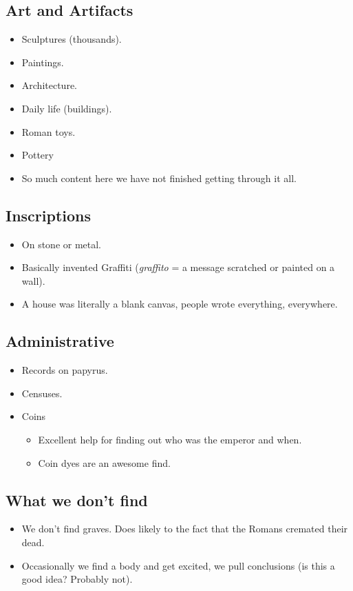 \documentclass[12pt, twoside]{article}
\begin{document}
\subsection{Art and Artifacts}
\begin{itemize}
\item Sculptures (thousands).
\item Paintings.
\item Architecture.
\item Daily life (buildings).
\item Roman toys.
\item Pottery
\item So much content here we have not finished getting through it all.
\end{itemize}

\subsection{Inscriptions}
\begin{itemize}
\item On stone or metal.
\item Basically invented Graffiti (\emph{graffito} = a message scratched or painted on a wall).
\item A house was literally a blank canvas, people wrote everything, everywhere. 
\end{itemize}

\subsection{Administrative}
\begin{itemize}
\item Records on papyrus.
\item Censuses.
\item Coins
	\begin{itemize}
	\item Excellent help for finding out who was the emperor and when.
	\item Coin dyes are an awesome find.
	\end{itemize}
\end{itemize}

\subsection{What we don't find}
\begin{itemize}
\item We don't find graves.  Does likely to the fact that the Romans cremated their dead.
\item Occasionally we find a body and get excited, we pull conclusions (is this a good idea? Probably not).
\end{itemize}
\end{document}
